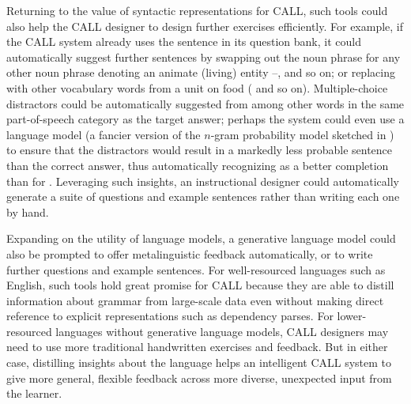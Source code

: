 Returning to the value of syntactic representations for CALL, such tools could 
 also help the CALL designer to design further exercises efficiently.  For example, if the CALL system already uses the sentence  in its question bank, it could automatically suggest further sentences by swapping out the noun phrase  for any other noun phrase denoting an animate (living) entity --, and so on; or replacing  with other vocabulary words from a unit on food ( and so on).  Multiple-choice distractors could be automatically suggested from among other words in the same part-of-speech category as the target answer; perhaps the system could even use a language model (a fancier version of the $n$-gram probability model sketched in ) to ensure that the distractors would result in a markedly less probable sentence than the correct answer, thus automatically recognizing  as a better completion than  for .  Leveraging such insights, an instructional designer could automatically generate a suite of questions and example sentences rather than writing each one by hand.

Expanding on the utility of language models, a generative language model could also be prompted to  offer metalinguistic feedback automatically, or to write further questions and example sentences.  For well-resourced languages such as English, such tools hold great promise for CALL because they are able to distill information about grammar from large-scale data even without making direct reference to explicit representations such as dependency parses.
For lower-resourced languages without generative language models, CALL designers may need to use more traditional handwritten exercises and feedback.  But in either case, distilling insights about the language helps an intelligent CALL system to give more general, flexible feedback across more diverse, unexpected input from the learner.




